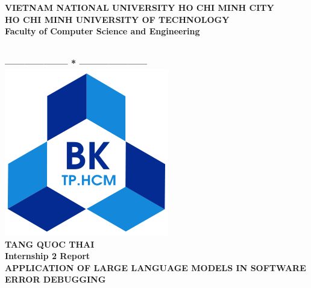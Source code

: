 \documentclass[a4paper,oneside]{book}
\begin{document}
\begin{titlepage}
    \thispagestyle{empty}
    \usetikzlibrary{calc}

    \begin{center}
        \begin{large}
            {\fontsize{12pt}{1}\textbf{VIETNAM NATIONAL UNIVERSITY HO CHI MINH CITY}} \\
            \fontsize{12pt}{1}\textbf{HO CHI MINH UNIVERSITY OF TECHNOLOGY} \\
            \fontsize{12pt}{1}\textbf{Faculty of Computer Science and Engineering}
        \end{large} \\
        \textbf{--------------------  *  ---------------------}\\

        \vspace{0.8cm}
        \includegraphics[scale=.35]{img/hcmut}\\
        \vspace{0.8cm}
        {\fontsize{14.4pt}{1}\selectfont \textbf{TANG QUOC THAI}}\\[.75cm]
        \vspace{0.8cm}
        {\fontsize{14.4pt}{1}\selectfont \textbf{Internship 2 Report}}\\[.75cm]
        {\fontsize{17pt}{1}\selectfont \textbf{\MakeUppercase{APPLICATION OF LARGE LANGUAGE MODELS IN SOFTWARE ERROR DEBUGGING}}}
    \end{center}
    \vspace{.4cm}


\end{titlepage}
\end{document}
